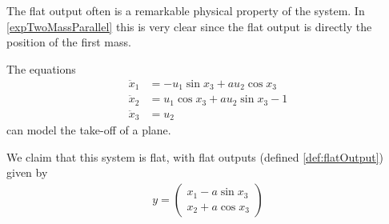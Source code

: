 \documentclass[12pt]{article}
\begin{document}
\begin{remark}
  The flat output often is a remarkable physical property of the system. In \ref{expTwoMassParallel} this is very
  clear since the flat output is directly the position of the first mass.
\end{remark}

\begin{example} \label{expVertPlaneTakeoff}
  The equations
  \begin{equation}\begin{aligned} \label{eq5}
    \ddot{x}_1 &= -u_1 \sin{x_3} + a u_2 \cos{x_3} \\
    \ddot{x}_2 &= u_1 \cos{x_3} + a u_2 \sin{x_3} - 1 \\
    \ddot{x}_3 &= u_2
  \end{aligned}\end{equation}
    can model the take-off of a plane.
    
    We claim that this system is flat, with flat outputs (defined \ref{def:flatOutput}) given by
    \begin{align}
      y =
      \begin{pmatrix}
        x_1 - a \sin{x_3} \\
        x_2 + a \cos{x_3}
      \end{pmatrix}
    \end{align}
\end{example}
\end{document}
